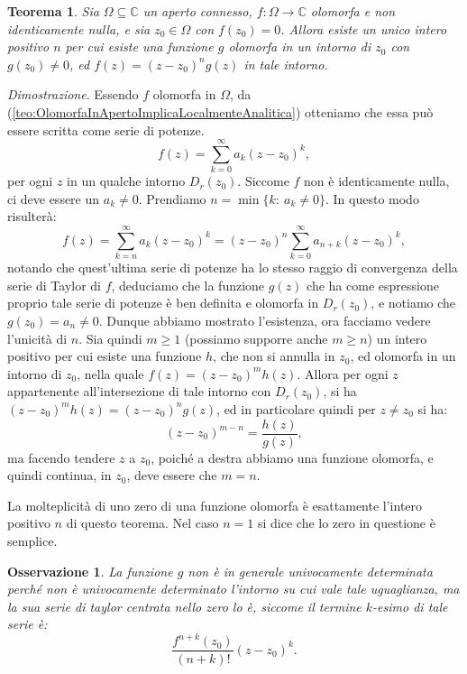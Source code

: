 \documentclass[11pt]{book}
\makeatletter
\theoremstyle{Definizione}
\theoremstyle{TeoremaProposizioneLemmaCorollarioCongettura}
\newtheorem{myteo}{Teorema}[section]
\theoremstyle{OsservazioneNotaEsempio}
\newtheorem{myobs}{Osservazione}[section]
\renewenvironment{proof}[1][\proofname]{\par
  \normalfont \topsep6\p@\@plus6\p@\relax
  \trivlist
  \item[\hskip\labelsep
        \itshape
    #1\@addpunct{.}]\ignorespaces
}{%
  \endtrivlist\@endpefalse
}
\renewenvironment{proof}{\textsl{Dimostrazione}.}{}
\newcommand{\C}{\mathbb{C}}
\newcommand{\Disc}[3][]{D^{#1}_{{#2}}({#3})}
\makeatother
\begin{document}
\begin{boxteo}{}
\begin{myteo}\label{teo:MolteplicitàZero}
Sia $\Omega\subseteq \C$ un aperto connesso, $f:\Omega\longrightarrow \C$ olomorfa e non identicamente nulla, e sia $z_0\in \Omega$ con $f(z_0) = 0$. Allora esiste un unico intero positivo $n$ per cui esiste una funzione $g$ olomorfa in un intorno di $z_0$ con $g(z_0) \neq 0$, ed $f(z) = (z-z_0)^{n}g(z)$ in tale intorno.
\end{myteo}
\tcblower
\begin{proof}
Essendo $f$ olomorfa in $\Omega$, da (\ref{teo:OlomorfaInApertoImplicaLocalmenteAnalitica}) otteniamo che essa può essere scritta come serie di potenze.
$$
f(z) = \sum_{k = 0}^{\infty} a_k (z-z_0)^k,
$$
per ogni $z$ in un qualche intorno $\Disc{r}{z_0}$. Siccome $f$ non è identicamente nulla, ci deve essere un $a_k \neq 0$. Prendiamo $n = \min\{k:\ a_k \neq 0\}$. In questo modo risulterà:
$$
f(z) = \sum_{k = n}^\infty a_k(z-z_0)^k = (z-z_0)^n \sum_{k = 0}^\infty a_{n+k}(z-z_0)^k,
$$
notando che quest'ultima serie di potenze ha lo stesso raggio di convergenza della serie di Taylor di $f$, deduciamo che la funzione $g(z)$ che ha come espressione proprio tale serie di potenze è ben definita e olomorfa in $\Disc{r}{z_0}$, e notiamo che $g(z_0) = a_n \neq 0$. Dunque abbiamo mostrato l'esistenza, ora facciamo vedere l'unicità di $n$. Sia quindi $m \geq 1$ (possiamo supporre anche $m \geq n$) un intero positivo per cui esiste una funzione $h$, che non si annulla in $z_0$, ed olomorfa in un intorno di $z_0$, nella quale $f(z) = (z-z_0)^m h(z)$. Allora per ogni $z$ appartenente all'intersezione di tale intorno con $\Disc{r}{z_0}$, si ha $(z-z_0)^m h(z) = (z-z_0)^n g(z)$, ed in particolare quindi per $z \neq z_0$ si ha:
$$
(z-z_0)^{m-n} = \frac{h(z)}{g(z)},
$$
ma facendo tendere $z$ a $z_0$, poiché a destra abbiamo una funzione olomorfa, e quindi continua, in $z_0$, deve essere che $m = n$. 
\end{proof}
\end{boxteo}
\noindent
La molteplicità di uno zero di una funzione olomorfa è esattamente l'intero positivo $n$ di questo teorema. Nel caso $n = 1$ si dice che lo zero in questione è semplice.
\begin{myobs}
La funzione $g$ non è in generale univocamente determinata perché non è univocamente determinato l'intorno su cui vale tale uguaglianza, ma la sua serie di taylor centrata nello zero lo è, siccome il termine $k$-esimo di tale serie è:
$$
\frac{f^{n+k}(z_0)}{(n+k)!}(z-z_0)^k.
$$
\end{myobs}
\end{document}
